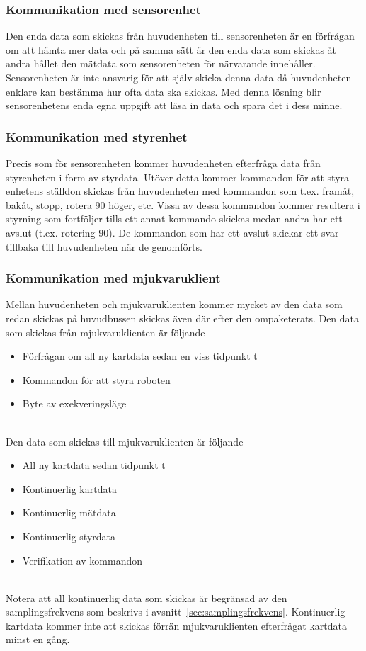 \documentclass{article}
\begin{document}
\subsubsection{Kommunikation med sensorenhet}
Den enda data som skickas från huvudenheten till sensorenheten är en förfrågan om att hämta mer data och på samma sätt är den enda data som skickas åt andra hållet den mätdata som sensorenheten för närvarande innehåller. Sensorenheten är inte ansvarig för att själv skicka denna data då huvudenheten enklare kan bestämma hur ofta data ska skickas. Med denna lösning blir sensorenhetens enda egna uppgift att läsa in data och spara det i dess minne.

\subsubsection{Kommunikation med styrenhet}
Precis som för sensorenheten kommer huvudenheten efterfråga data från styrenheten i form av styrdata. Utöver detta kommer kommandon för att styra enhetens ställdon skickas från huvudenheten med kommandon som t.ex. framåt, bakåt, stopp, rotera 90{\textdegree} höger, etc. Vissa av dessa kommandon kommer resultera i styrning som fortföljer tills ett annat kommando skickas medan andra har ett avslut (t.ex. rotering 90{\textdegree}). De kommandon som har ett avslut skickar ett svar tillbaka till huvudenheten när de genomförts.

\subsubsection{Kommunikation med mjukvaruklient}
Mellan huvudenheten och mjukvaruklienten kommer mycket av den data som redan skickas på huvudbussen skickas även där efter den ompaketerats.
\newline\newline
Den data som skickas från mjukvaruklienten är följande
\begin{itemize}
\item Förfrågan om all ny kartdata sedan en viss tidpunkt t
\item Kommandon för att styra roboten
\item Byte av exekveringsläge
\end{itemize}
\ \\
Den data som skickas till mjukvaruklienten är följande
\begin{itemize}
\item All ny kartdata sedan tidpunkt t
\item Kontinuerlig kartdata
\item Kontinuerlig mätdata
\item Kontinuerlig styrdata
\item Verifikation av kommandon
\end{itemize}
\ \\
Notera att all kontinuerlig data som skickas är begränsad av den samplingsfrekvens som beskrivs i avsnitt~\ref{sec:samplingsfrekvens}. Kontinuerlig kartdata kommer inte att skickas förrän mjukvaruklienten efterfrågat kartdata minst en gång.
\end{document}
